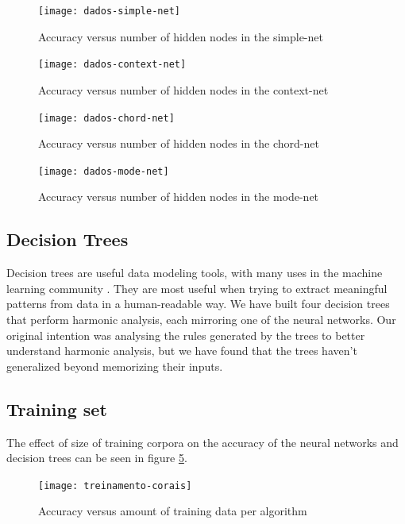\documentclass{article}
\begin{document}
\begin{figure}
  \texttt{[image: dados-simple-net]}
  \caption{Accuracy versus number of hidden nodes in the simple-net}
  \label{fig:simple-net}
\end{figure}

\begin{figure}
  \texttt{[image: dados-context-net]}
  \caption{Accuracy versus number of hidden nodes in the context-net}
  \label{fig:context-net}
\end{figure}

\begin{figure}
  \texttt{[image: dados-chord-net]}
  \caption{Accuracy versus number of hidden nodes in the chord-net}
  \label{fig:chord-net}
\end{figure}

\begin{figure}
  \texttt{[image: dados-mode-net]}
  \caption{Accuracy versus number of hidden nodes in the mode-net}
  \label{fig:mode-net}
\end{figure}

\subsection{Decision Trees}

Decision trees are useful data modeling tools, with many uses in the
machine learning community \cite{Mitchell:1997:ML,
  russell02:aima}. They are most useful when trying to extract
meaningful patterns from data in a human-readable way. We have built
four decision trees that perform harmonic analysis, each mirroring one
of the neural networks. Our original intention was analysing the rules
generated by the trees to better understand harmonic analysis, but we
have found that the trees haven't generalized beyond memorizing their
inputs.

\subsection{Training set}

The effect of size of training corpora on the accuracy of the neural
networks and decision trees can be seen in figure
\ref{fig:treinamento-corais}.

\begin{figure}
  \texttt{[image: treinamento-corais]}
  \caption{Accuracy versus amount of training data per algorithm}
  \label{fig:treinamento-corais}
\end{figure}
\end{document}
